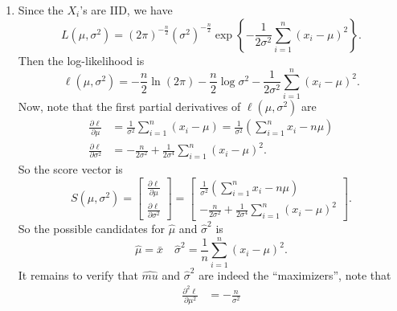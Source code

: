 \documentclass[notoc,notitlepage]{tufte-book}
\begin{document}
\begin{solution}
  \begin{enumerate}
    \item Since the $X_i$'s are IID, we have
      \begin{equation*}
        L\left(\mu, \sigma^2\right) = ( 2 \pi )^{- \frac{n}{2}} \left( \sigma^2 \right)^{- \frac{n}{2}} \exp \left\{ - \frac{1}{2 \sigma^2} \sum_{i=1}^{n} \left( x_i - \mu \right)^2 \right\}.
      \end{equation*}
      Then the log-likelihood is
      \begin{equation*}
        \ell\left( \mu, \sigma^2 \right) = - \frac{n}{2} \ln (2 \pi) - \frac{n}{2} \log \sigma^2 - \frac{1}{2 \sigma^2} \sum_{i=1}^{n} ( x_i - \mu )^2.
      \end{equation*}
      Now, note that the first partial derivatives of $\ell\left(\mu, \sigma^2\right)$ are
      \begin{align*}
        \frac{\partial \ell}{\partial \mu} &= \frac{1}{\sigma^2} \sum_{i=1}^{n} ( x_i - \mu ) = \frac{1}{\sigma^2} \left( \sum_{i=1}^{n} x_i - n \mu \right) \\
        \frac{\partial \ell}{\partial \sigma^2} &= - \frac{n}{2 \sigma^2} + \frac{1}{2 \sigma^4} \sum_{i=1}^{n} (x_i - \mu)^2.
      \end{align*}
      So the score vector is
      \begin{equation*}
        S\left(\mu, \sigma^2\right) = \begin{bmatrix}
          \frac{\partial \ell}{\partial \mu} \\
          \frac{\partial \ell}{\partial \sigma^2}
        \end{bmatrix} = \begin{bmatrix}
          \frac{1}{\sigma^2} \left( \sum_{i=1}^{n} x_i - n \mu  \right) \\
          - \frac{n}{2 \sigma^2} + \frac{1}{2 \sigma^4} \sum_{i=1}^{n} ( x_i - \mu )^2
        \end{bmatrix}.
      \end{equation*}
      So the possible candidates for $\hat{\mu}$ and $\hat{\sigma}^2$ is
      \begin{equation*}
        \hat{\mu} = \bar{x} \quad \hat{\sigma}^2 = \frac{1}{n} \sum_{i=1}^{n} (x_i - \mu)^2.
      \end{equation*}
      It remains to verify that $\hat{mu}$ and $\hat{\sigma}^2$ are indeed the ``maximizers'', note that
      \begin{align*}
        \frac{\partial^2 \ell}{\partial \mu^2} &= - \frac{n}{\sigma^2} \\

\end{align*}
\end{enumerate}
\end{solution}
\end{document}
